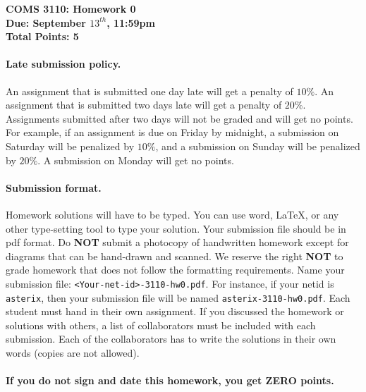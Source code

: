 \documentclass[12pt]{article}
\date{}
\begin{document}
\begin{center}
  \textbf{COMS 3110: Homework 0}\\
  \textbf{Due: September $13^{th}$, 11:59pm}\\
  \textbf{Total Points: 5}
\end{center}


\paragraph{Late submission policy.\ }
An assignment that is submitted one day late will get a penalty of $10\%$. An assignment that is submitted two days late will get a penalty of $20\%$. Assignments submitted after two days will not be graded and will get no points. For example, if an assignment is due on Friday by midnight, a submission on Saturday will be penalized by $10\%$, and a submission on Sunday will be penalized by $20\%$. A submission on Monday will get no points. 

\paragraph{Submission format.\ }
Homework solutions will have to be typed. You can use word, LaTeX, or any other type-setting tool to type your solution. Your submission file should be in pdf format. Do \textbf{NOT} submit a photocopy of handwritten homework except for diagrams that can be hand-drawn and scanned. We reserve the right \textbf{NOT} to grade homework that does not follow the formatting requirements.
Name your submission
file: \texttt{<Your-net-id>-3110-hw0.pdf}. For instance, if your netid
is \texttt{asterix}, then your submission file will be named
\texttt{asterix-3110-hw0.pdf}.
Each student must hand in their own assignment. If you discussed the homework or solutions with others, a list of collaborators must be included with each submission. Each of the collaborators has to write the solutions in their own words (copies are not allowed).\\ \\
\textbf{If you do not sign and date this homework, you get ZERO points.}
\end{document}
